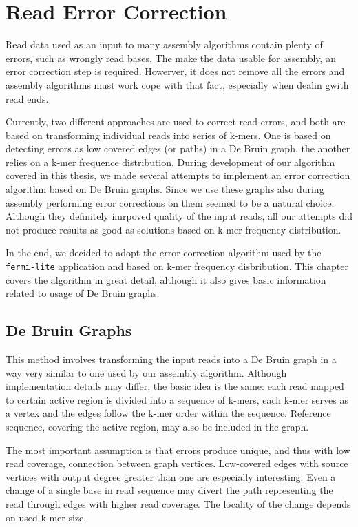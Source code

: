 \chapter{Read Error Correction}
\label{chap:read-error-correction}

Read data used as an input to many assembly algorithms contain plenty of errors, such as wrongly read bases. The make the data usable for assembly, an error correction step is required. Howerver, it does not remove all the errors and assembly algorithms must work cope with that fact, especially when dealin gwith read ends.

Currently, two different approaches are used to correct read errors, and both are based on transforming individual reads into series of k-mers. One is based on detecting errors as low covered edges (or paths) in a De Bruin graph, the another relies on a k-mer frequence distribution. During development of our algorithm covered in this thesis, we made several attempts to implement an error correction algorithm based on De Bruin graphs. Since we use these graphs also during assembly performing error corrections on them seemed to be a natural choice. Although they definitely imrpoved quality of the input reads, all our attempts did not produce results as good as solutions based on k-mer frequency distribution.

In the end, we decided to adopt the error correction algorithm used by the \texttt{fermi-lite} application and based on k-mer frequency disbribution. This chapter covers the algorithm in great detail, although it also gives basic information related to usage of De Bruin graphs.

\section{De Bruin Graphs}
\label{sec:ec-de-bruin-graphs}

This method involves transforming the input reads into a De Bruin graph in a way very similar to one used by our assembly algorithm. Although implementation details may differ, the basic idea is the same: each read mapped to certain active region is divided into a sequence of k-mers, each k-mer serves as a vertex and the edges follow the k-mer order within the sequence. Reference sequence, covering the active region, may also be included in the graph.

The most important assumption is that errors produce unique, and thus with low read coverage, connection between graph vertices. Low-covered edges with source vertices with output degree greater than one are especially interesting. Even a change of a single base in read sequence may divert the path representing the read through edges with higher read coverage. The locality of the change depends on used k-mer size.

